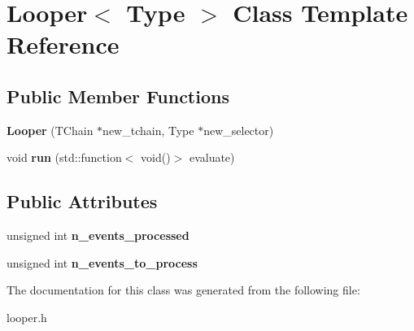 \hypertarget{classLooper}{}\section{Looper$<$ Type $>$ Class Template Reference}
\label{classLooper}
\subsection*{Public Member Functions}
\begin{DoxyCompactItemize}
\item 
{\bfseries Looper} (T\+Chain $\ast$new\+\_\+tchain, Type $\ast$new\+\_\+selector)\hypertarget{classLooper_a1328b8985a65807d46cbc23532917fd5}{}\label{classLooper_a1328b8985a65807d46cbc23532917fd5}

\item 
void {\bfseries run} (std\+::function$<$ void()$>$ evaluate)\hypertarget{classLooper_abfa564ca48778da1f58c8a6444ddd463}{}\label{classLooper_abfa564ca48778da1f58c8a6444ddd463}

\end{DoxyCompactItemize}
\subsection*{Public Attributes}
\begin{DoxyCompactItemize}
\item 
unsigned int {\bfseries n\+\_\+events\+\_\+processed}\hypertarget{classLooper_a97e473848469359cd33cd23771e0eb28}{}\label{classLooper_a97e473848469359cd33cd23771e0eb28}

\item 
unsigned int {\bfseries n\+\_\+events\+\_\+to\+\_\+process}\hypertarget{classLooper_a666747cb782bd6082452a6d5ac18f94f}{}\label{classLooper_a666747cb782bd6082452a6d5ac18f94f}

\end{DoxyCompactItemize}


The documentation for this class was generated from the following file\+:\begin{DoxyCompactItemize}
\item 
looper.\+h\end{DoxyCompactItemize}
